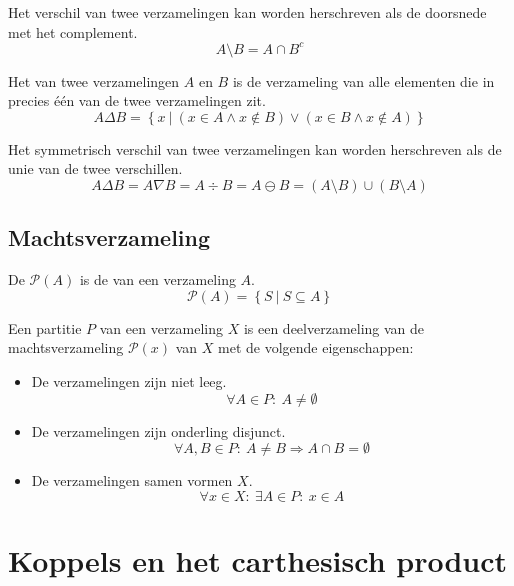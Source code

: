 \documentclass[main.tex]{subfiles}
\begin{document}
\begin{st}
  Het verschil van twee verzamelingen kan worden herschreven als de doorsnede met het complement.
  \[ A \setminus B = A \cap B^{c} \]
\end{st}


\begin{de}
  Het  van twee verzamelingen $A$ en $B$ is de verzameling van alle elementen die in precies \'e\'en van de twee verzamelingen zit.
  \[ A \Delta B = \left\{ x\ |\ (x \in A \wedge x \not\in B) \vee (x \in B \wedge x \not\in A) \right\} \]
\end{de}

\begin{st}
  Het symmetrisch verschil van twee verzamelingen kan worden herschreven als de unie van de twee verschillen.
  \[ A \Delta B = A \nabla B = A \div B = A \ominus B = (A \setminus B) \cup (B \setminus A) \]
\end{st}

\subsection{Machtsverzameling}
\label{sec:machtsverzameling}

\begin{de}
  \label{de:machtsverzameling}
  De  $\mathcal P(A)$ is de  van een verzameling $A$.
  \[ \mathcal P(A) = \left\{ S\ |\ S \subseteq A \right\} \]
\end{de}

\begin{de}
  \label{de:partitie}
  Een partitie $P$ van een verzameling $X$ is een deelverzameling van de machtsverzameling $\mathcal {P}(x)$ van $X$ met de volgende eigenschappen:
  \begin{itemize}
  \item De verzamelingen zijn niet leeg.
    \[ \forall A \in P:\ A \neq \emptyset \]
  \item De verzamelingen zijn onderling disjunct.
    \[ \forall A,B \in P:\ A \neq B \Rightarrow A \cap B = \emptyset \]
  \item De verzamelingen samen vormen $X$.
    \[ \forall x \in X:\ \exists A \in P:\ x \in A \]
  \end{itemize}
\end{de}


\section{Koppels en het carthesisch product}
\label{sec:koppels-en-het-carthesisch-product}
\end{document}
